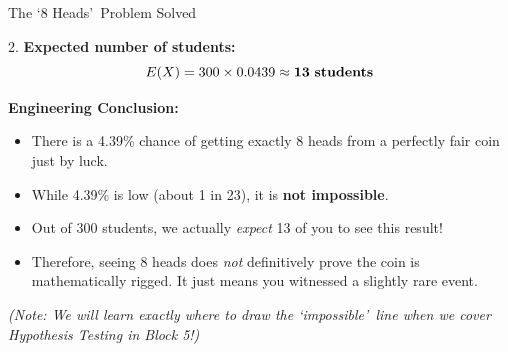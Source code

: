 \begin{frame}[allowframebreaks]{The \lq 8 Heads\rq\ Problem Solved}
\begin{solution}
        \vspace{0.3cm}
        2. \textbf{Expected number of students:} 
        \[ E(X) = 300 \times 0.0439 \approx \mathbf{13} \text{ \textbf{students}} \]
    \end{solution}
    
    \framebreak
    
    \begin{solutioncont}
        \textbf{Engineering Conclusion:}
        \begin{itemize}
            \item There is a 4.39\% chance of getting exactly 8 heads from a perfectly fair coin just by luck.
            \item While 4.39\% is low (about 1 in 23), it is \textbf{not impossible}. 
            \item Out of 300 students, we actually \textit{expect} 13 of you to see this result!
            \item Therefore, seeing 8 heads does \textit{not} definitively prove the coin is mathematically rigged. It just means you witnessed a slightly rare event.
        \end{itemize}
        
        \vspace{0.4cm}
        \textit{(Note: We will learn exactly where to draw the \lq impossible\rq\ line when we cover Hypothesis Testing in Block 5!)}
    \end{solutioncont}
\end{frame}

